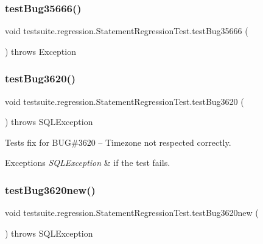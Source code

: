 \subsubsection{\texorpdfstring{test\+Bug35666()}{testBug35666()}}
{\footnotesize\ttfamily void testsuite.\+regression.\+Statement\+Regression\+Test.\+test\+Bug35666 (\begin{DoxyParamCaption}{ }\end{DoxyParamCaption}) throws Exception}

\mbox{\label{classtestsuite_1_1regression_1_1_statement_regression_test_aff7b0f7e5043e4a16d128d96ad607be6}} 
\subsubsection{\texorpdfstring{test\+Bug3620()}{testBug3620()}}
{\footnotesize\ttfamily void testsuite.\+regression.\+Statement\+Regression\+Test.\+test\+Bug3620 (\begin{DoxyParamCaption}{ }\end{DoxyParamCaption}) throws S\+Q\+L\+Exception}

Tests fix for B\+UG\#3620 -- Timezone not respected correctly.


\begin{DoxyExceptions}{Exceptions}
{\em S\+Q\+L\+Exception} & if the test fails. \\
\hline
\end{DoxyExceptions}
\mbox{\label{classtestsuite_1_1regression_1_1_statement_regression_test_a1e239d5a9f63b634b11ab2451ef579eb}} 
\subsubsection{\texorpdfstring{test\+Bug3620new()}{testBug3620new()}}
{\footnotesize\ttfamily void testsuite.\+regression.\+Statement\+Regression\+Test.\+test\+Bug3620new (\begin{DoxyParamCaption}{ }\end{DoxyParamCaption}) throws S\+Q\+L\+Exception}

